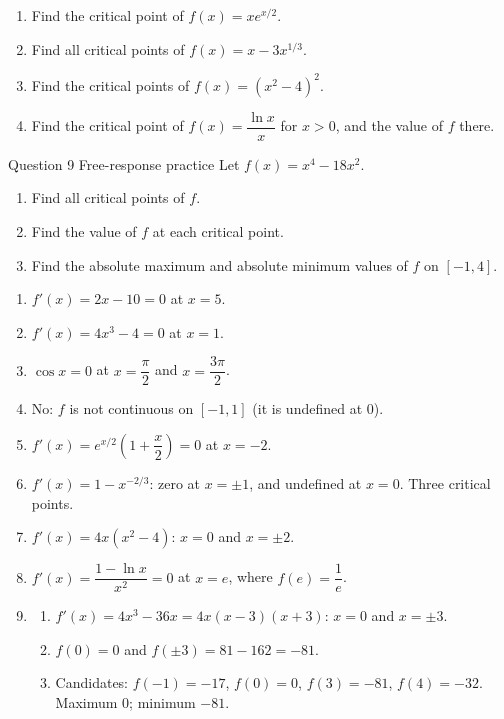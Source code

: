 \documentclass[11pt]{article}
\begin{document}
\begin{enumerate}[leftmargin=*,itemsep=2pt,start=5]
  \item Find the critical point of $f(x)=xe^{x/2}$.\work{2.8cm}
  \item Find all critical points of $f(x)=x-3x^{1/3}$.\work{2.8cm}
  \item Find the critical points of $f(x)=\left(x^2-4\right)^2$.\work{2.8cm}
  \item Find the critical point of $f(x)=\dfrac{\ln x}{x}$ for $x>0$, and the value of $f$ there.\work{2.8cm}
\end{enumerate}

\begin{frbox}{Question 9 \textperiodcentered{} Free-response practice}
Let $f(x)=x^4-18x^2$.
\begin{enumerate}[label=(\alph*),leftmargin=*,itemsep=2pt]
  \item Find all critical points of $f$.\work{2.6cm}
  \item Find the value of $f$ at each critical point.\work{2.6cm}
  \item Find the absolute maximum and absolute minimum values of $f$ on $[-1,4]$.\work{2.6cm}
\end{enumerate}
\end{frbox}

\newpage
\begin{solbox}
\begin{enumerate}[leftmargin=*,itemsep=4pt]
  \item $f'(x)=2x-10=0$ at $x=5$.
  \item $f'(x)=4x^3-4=0$ at $x=1$.
  \item $\cos x=0$ at $x=\dfrac\pi2$ and $x=\dfrac{3\pi}{2}$.
  \item No: $f$ is not continuous on $[-1,1]$ (it is undefined at 0).
  \item $f'(x)=e^{x/2}\left(1+\dfrac x2\right)=0$ at $x=-2$.
  \item $f'(x)=1-x^{-2/3}$: zero at $x=\pm1$, and undefined at $x=0$. Three critical points.
  \item $f'(x)=4x\left(x^2-4\right)$: $x=0$ and $x=\pm2$.
  \item $f'(x)=\dfrac{1-\ln x}{x^2}=0$ at $x=e$, where $f(e)=\dfrac1e$.
  \item \begin{enumerate}[label=(\alph*),leftmargin=*,itemsep=3pt]
    \item $f'(x)=4x^3-36x=4x(x-3)(x+3)$: $x=0$ and $x=\pm3$.
    \item $f(0)=0$ and $f(\pm3)=81-162=-81$.
    \item Candidates: $f(-1)=-17$, $f(0)=0$, $f(3)=-81$, $f(4)=-32$. Maximum 0; minimum $-81$.
  \end{enumerate}
\end{enumerate}
\end{solbox}
\end{document}
